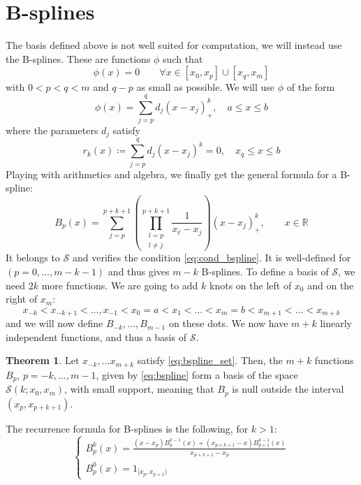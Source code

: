 \documentclass[12pt, openany]{report}
\newcommand{\R}{\mathbb{R}}
\theoremstyle{definition}
\newtheorem{thm}{Theorem}[chapter]
\begin{document}
\section{B-splines}
The basis defined above is not well suited for computation, we will instead use the B-splines. These are functions \(\phi\) such that 
\begin{equation}\label{eq:cond_bspline}
    \phi(x) = 0\qquad \forall x\in [x_0,x_p]\cup [x_q,x_m]
\end{equation}
with \(0<p<q<m\) and \(q-p\) as small as possible. We will use \(\phi\) of the form 
\begin{equation}
    \phi(x) = \sum_{j=p}^qd_j(x-x_j)^k_+, \quad a\le x \le b
\end{equation} 
where the parameters \(d_j\) satisfy
\begin{equation}
    r_k(x)\coloneqq \sum_{j=p}^qd_j(x-x_j)^k=0,\quad x_q\le x\le b
\end{equation}
Playing with arithmetics and algebra, we finally get the general formula for a B-spline:
\begin{equation}\label{eq:bspline}
    B_p(x) = \sum_{j=p}^{p+k+1}\left(\prod_{\substack{l=p\\ l\neq j}}^{p+k+1}\frac{1}{x_\ell-x_j}\right)(x-x_j)^k_+,\qquad x\in \R
\end{equation}
It belongs to \(\mathcal{S}\) and verifies the condition \eqref{eq:cond_bspline}. It is well-defined for \((p=0,\dots,m-k-1)\) and thus gives \(m-k\) B-splines. To define a basis of \(\mathcal{S}\), we need \(2k\) more functions. We are going to add \(k\) knots on the left of \(x_0\) and on the right of \(x_m\):
\begin{equation}\label{eq:bspline_set}
    x_{-k}<x_{-k+1}<\dots,x_{-1}<x_0=a<x_1<\dots<x_{m}=b<x_{m+1}<\dots<x_{m+k}
\end{equation}
and we will now define \(B_{-k},\dots,B_{m-1}\) on these dots. We now have \(m+k\) linearly independent functions, and thus a basis of \(\mathcal{S}\). 
\begin{thm}
    Let \(x_{-k},\dots x_{m+k}\) satisfy \eqref{eq:bspline_set}. Then, the \(m+k\) functions \(B_p\), \(p=-k,\dots,m-1\), given by \eqref{eq:bspline} form a basis of the space \(\mathcal{S}(k;x_0,x_m)\), with small support, meaning that \(B_p\) is null outside the interval \((x_p,x_{p+k+1})\). 
\end{thm}
The recurrence formula for B-splines is the following, for \(k>1\):
\begin{equation}
    \begin{cases}
        B_p^k(x) = \frac{(x-x_p)B_p^{k-1}(x)+(x_{p+k+1}-x)B_{p+1}^{k-1}(x)}{x_{p+k+1}-x_p}\\
        B_p^0(x) = 1_{[x_p,x_{p+1})}
    \end{cases}
\end{equation}
\end{document}
